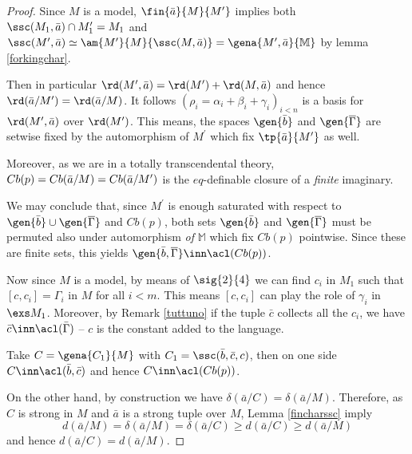 \begin{proof}
Since $M$ is a model, $\fin{\bar a}{M}{M^{\prime}}$ implies both $\ssc(M_{1},\bar a)\cap M^{\prime}_{1}=M_{1}$
and $\ssc(M^{\prime},\bar a)\simeq\am{M^{\prime}}{M}{\ssc(M,\bar a)}=\gena{M^{\prime},\bar a}{\mathbb{M}}$
by lemma \ref{forkingchar}.

Then in particular $\rd(M^{\prime},\bar a)=\rd(M^{\prime})+\rd(M,\bar a)$
and hence %
$\rd(\bar a/M^{\prime})=\rd(\bar a/M)$. It follows $(\rho_{i}=\alpha_{i}+\beta_{i}+\gamma_{i})_{i<n}$ is
a basis for $\rd(M^{\prime},\bar a)$ over $\rd(M^{\prime})$.
This means, the spaces $\gen{\bar b}$ and $\gen{\overline{\Gamma}}$
are setwise fixed by the automorphism of
$M^{\prime}$ which fix $\tp{\bar a}{M^{\prime}}$ as well.

Moreover, as we are in a totally transcendental theory, $Cb(p)=Cb(\bar a/M)\\
=Cb(\bar a/M^{\prime})$ is
the $eq$-definable closure of a {\em finite} imaginary.

We may conclude that, since $M^{\prime}$ is enough saturated with respect to $\gen{\bar b}\cup\gen{\overline{\Gamma}}$ and $Cb(p)$,
both sets $\gen{\bar b}$ and $\gen{\overline{\Gamma}}$ must be permuted also under automorphism {\em of} $\mathbb{M}$ which
fix $Cb(p)$ pointwise. Since these are finite sets, this yields $\gen{\bar b, %
\overline{\Gamma}}\inn\acl(Cb(p))$.

\medskip
Now since $M$ is a model, by means of $\sig{2}{4}$ we can find $c_{i}$ in $M_{1}$ such that
$[c,c_{i}]=\Gamma_{i}$ in $M$ for all $i<m$. This means $[c,c_{i}]$ can play the role of $\gamma_{i}$ in $\exs M_{1}$.
Moreover, by Remark \ref{tuttuno} if the tuple $\bar c$ collects all the $c_{i}$, %
we have $\bar c\inn\acl(\bar\Gamma)$ -- $c$ is the constant added to the language.

Take $C=\gena{C_{1}}{M}$ with $C_{1}=\ssc(\bar b,\bar c,c)$,
then on one side $C\inn\acl(\bar b,\bar c)$ and hence $C\inn\acl(Cb(p))$.

\medskip
On the other hand, by construction we have $\delta(\bar a/C)=\delta(\bar a/M)$. %
Therefore, as $C$ is strong in $M$ and $\bar a$ is a strong tuple over $M$, Lemma \ref{fincharssc} imply
$$
d(\bar a/M)=\delta(\bar a/M)=\delta(\bar a/C)\geq d(\bar a/C)\geq d(\bar a/M)
$$
and hence $d(\bar a/C)=d(\bar a/M)$.


\end{proof}
